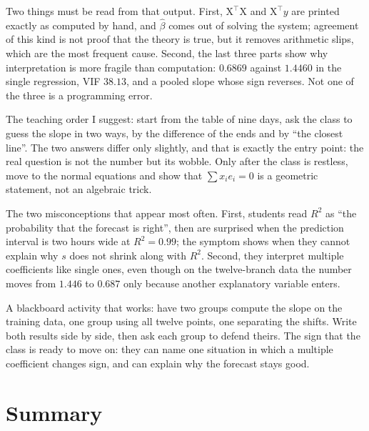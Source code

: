 Two things must be read from that output. First, $\mathrm{X}^{\top}\mathrm{X}$ and
$\mathrm{X}^{\top}y$ are printed exactly as computed by hand, and $\hat\beta$ comes out of
solving the system; agreement of this kind is not proof that the theory is true, but it removes
arithmetic slips, which are the most frequent cause. Second, the last three parts show why
interpretation is more fragile than computation: $0.6869$ against $1.4460$ in the single
regression, VIF $38.13$, and a pooled slope whose sign reverses. Not one of the three is a
programming error.

\begin{untukdosen}
The teaching order I suggest: start from the table of nine days, ask the class to guess the slope
in two ways, by the difference of the ends and by ``the closest line''. The two answers differ
only slightly, and that is exactly the entry point: the real question is not the number but its
wobble. Only after the class is restless, move to the normal equations and show that
$\sum x_ie_i=0$ is a geometric statement, not an algebraic trick.

The two misconceptions that appear most often. First, students read $R^2$ as ``the probability
that the forecast is right'', then are surprised when the prediction interval is two hours wide
at $R^2=0.99$; the symptom shows when they cannot explain why $s$ does not shrink along with
$R^2$. Second, they interpret multiple coefficients like single ones, even though on the
twelve-branch data the number moves from $1.446$ to $0.687$ only because another explanatory
variable enters.

A blackboard activity that works: have two groups compute the slope on the training data, one
group using all twelve points, one separating the shifts. Write both results side by side, then
ask each group to defend theirs. The sign that the class is ready to move on: they can name one
situation in which a multiple coefficient changes sign, and can explain why the forecast stays
good.
\end{untukdosen}

\section{Summary}

